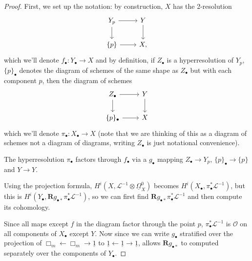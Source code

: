 \documentclass[proquest]{uwthesis}[2014/11/13]
\theoremstyle{definition}
\newcommand{\LL}{\mathcal{L}}
\newcommand{\OO}{\mathcal{O}}
\newcommand{\bR}{\textbf{R}}
\newcommand{\DB}{\underline{\Omega}}
\begin{document}
\begin{proof}
	First, we set up the notation: by construction, $X$ has the 2-resolution
	\[
	\begin{tikzcd}
	Y_p \ar{r} \ar{d} & Y \ar{d} \\
	\{p\} \ar{r} & X,
	\end{tikzcd}\]
	which we'll denote $f_\bullet : Y_\bullet \rightarrow X$
	and by definition, if $Z_\bullet$ is a hyperresolution of $Y_p$, $\{p\}_\bullet$ denotes the diagram of schemes of the same shape as $Z_\bullet$ but with each component $p$, then the diagram of schemes
	\[
	\begin{tikzcd}
	Z_\bullet \ar{r} \ar{d} & Y \ar{d} \\
	\{p\}_\bullet \ar{r} & X
	\end{tikzcd}\]
	which we'll denote $\pi_\bullet : X_\bullet \rightarrow X$ (note that we are thinking of this as a diagram of schemes not a diagram of diagrams, writing $Z_\bullet$ is just notational convenience).
		
	The hyperresolution $\pi_\bullet$ factors through $f_\bullet$ via a $g_\bullet$ mapping $Z_\bullet \rightarrow Y_p$, $\{p\}_\bullet \rightarrow \{p\}$ and $Y \rightarrow Y$.
		
	Using the projection formula, $H^i(X, \LL^{-1} \otimes \DB_{X}^0)$ becomes $H^i(X_\bullet, \pi_\bullet^* \LL^{-1})$, but this is $H^i(Y_\bullet, \bR g_{\bullet *} \pi_\bullet^* \LL^{-1})$, so we can first find $\bR g_{\bullet *} \pi_\bullet^* \LL^{-1}$ and then compute its cohomology.
		
	Since all maps except $f$ in the diagram factor through the point $p$, $\pi_\bullet^* \LL^{-1}$ is $\OO$ on all components of $X_\bullet$ except $Y$.
	Now since we can write $g_\bullet$ stratified over the projection of $\Box_m \leftarrow \Box_m \rightarrow \underline{1}$ to $\underline{1} \leftarrow \underline{1} \rightarrow \underline{1}$, \cite[I 5.14]{Guillen1988} allows $\bR g_{\bullet *}$ to computed separately over the components of $Y_\bullet$.
		

\end{proof}
\end{document}

